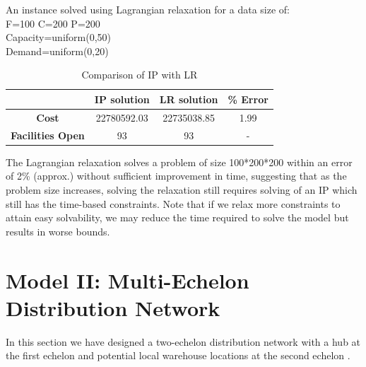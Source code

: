 \documentclass[12pt]{article}
\numberwithin{equation}{section}
\begin{document}
An instance solved using Lagrangian relaxation for a data size of:\\
F=100 C=200 P=200\\
Capacity=uniform(0,50)\\
Demand=uniform(0,20)\\

\begin{table}[H]
\centering
\caption{Comparison of IP with LR}
\label{my-label}
\begin{tabular}{|c|c|c|c|}
\hline
\textbf{} & \textbf{IP solution} & \textbf{LR solution} & \multicolumn{1}{l|}{\textbf{\% Error}} \\ \hline
\textbf{Cost} & 22780592.03 & 22735038.85 & 1.99 \\ \hline
\textbf{Facilities Open} & 93 & 93 & - \\ \hline
\end{tabular}
\end{table}
The Lagrangian relaxation solves a problem of size 100*200*200 within an error of 2\% (approx.) without sufficient improvement in time, suggesting that as the problem size increases, solving the relaxation still requires solving of an IP which still has the time-based constraints. Note that if we relax more constraints to attain easy solvability, we may reduce the time required to solve the model but results in worse bounds.
\section{Model II: Multi-Echelon Distribution Network}
In this section we have designed a two-echelon distribution network with a hub at the first echelon and potential local warehouse locations at the second echelon \cite{CH}.
\end{document}
